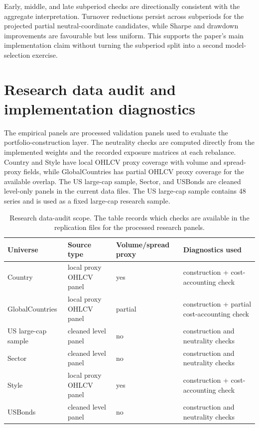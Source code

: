 \documentclass[11pt]{article}
\begin{document}
\FloatBarrier

Early, middle, and late subperiod checks are directionally consistent with the aggregate interpretation.
Turnover reductions persist across subperiods for the projected partial neutral-coordinate candidates, while Sharpe
and drawdown improvements are favourable but less uniform.  This supports the paper's main
implementation claim without turning the subperiod split into a second model-selection exercise.

\FloatBarrier
\section{Research data audit and implementation diagnostics}

The empirical panels are processed validation panels used to evaluate the portfolio-construction layer.
The neutrality checks are computed directly from the implemented weights and the recorded exposure
matrices at each rebalance.  Country and Style have local OHLCV proxy coverage with volume and
spread-proxy fields, while GlobalCountries has partial OHLCV proxy coverage for the available overlap.
The US large-cap sample, Sector, and USBonds are cleaned level-only panels in the current data files.
The US large-cap sample contains 48 series and is used as a fixed large-cap research sample.

\begin{table}[!htbp]
\centering
\scriptsize
\begin{tabular}{lllp{2.35in}}
\toprule
Universe & Source type & Volume/spread proxy & Diagnostics used \\
\midrule
Country & local proxy OHLCV panel & yes & construction + cost-accounting check \\
GlobalCountries & local proxy OHLCV panel & partial & construction + partial cost-accounting check \\
US large-cap sample & cleaned level panel & no & construction and neutrality checks \\
Sector & cleaned level panel & no & construction and neutrality checks \\
Style & local proxy OHLCV panel & yes & construction + cost-accounting check \\
USBonds & cleaned level panel & no & construction and neutrality checks \\
\bottomrule
\end{tabular}
\caption{Research data-audit scope.  The table records which checks are available in the replication files for the processed research panels.}
\label{tab:data-scope}
\end{table}
\end{document}
